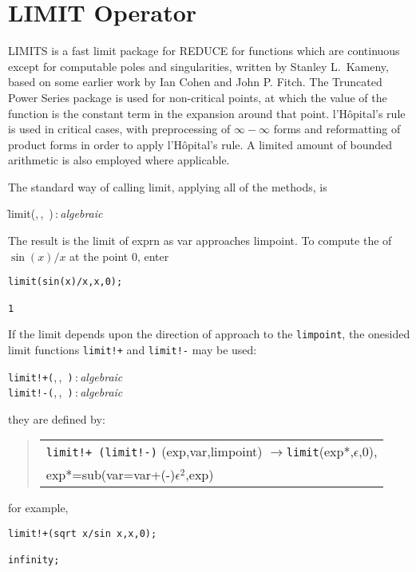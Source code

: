 \section{LIMIT Operator}

LIMITS is a fast limit package for REDUCE for functions which are
continuous except for computable poles and singularities, written by Stanley L.~Kameny, based on some
earlier work by Ian Cohen and John P. Fitch.  The Truncated Power Series
package is used for non-critical points, at which the value of the
function is the constant term in the expansion around that point.
l'H\^opital's rule is used in critical cases, with preprocessing of
$\infty - \infty$ forms and reformatting of product forms in order
to apply l'H\^opital's rule.  A limited amount of bounded arithmetic
is also employed where applicable.

The standard way of calling limit, applying all of the methods, is
\hypertarget{operator:LIMIT}{}
\begin{syntax}
  \f{limit(},\,,\,%
    )\,:\,\textit{algebraic}
\end{syntax}
The result is the limit of exprn as var approaches limpoint.
To compute the of \(\sin(x)/x\) at the point $0$, enter
\begin{verbatim}
limit(sin(x)/x,x,0);

1
\end{verbatim}
If the limit depends upon the direction of approach to the \texttt{limpoint},                                                                                                        the onesided limit functions \texttt{limit!+} and \texttt{limit!-} may be used:
\hypertarget{operator:LIMIT+}{}
\hypertarget{operator:LIMIT-}{}
\begin{syntaxtable}
  \texttt{limit!+(},\,,\,%
    \texttt{)}\,:\,\textit{algebraic} \\
  \texttt{limit!-(},\,,\,%
    \texttt{)}\,:\,\textit{algebraic}
\end{syntaxtable}
they are defined by:
\begin{quote}
\begin{tabular}{l}
 \texttt{limit!+ (limit!-)} (exp,var,limpoint) $\rightarrow$\texttt{limit}(exp*,$\epsilon$,0), \\
  \qquad exp*=sub(var=var+(-)$\epsilon^2$,exp)
\end{tabular}
\end{quote}
for example,
\begin{verbatim}
limit!+(sqrt x/sin x,x,0);

infinity;
\end{verbatim}


